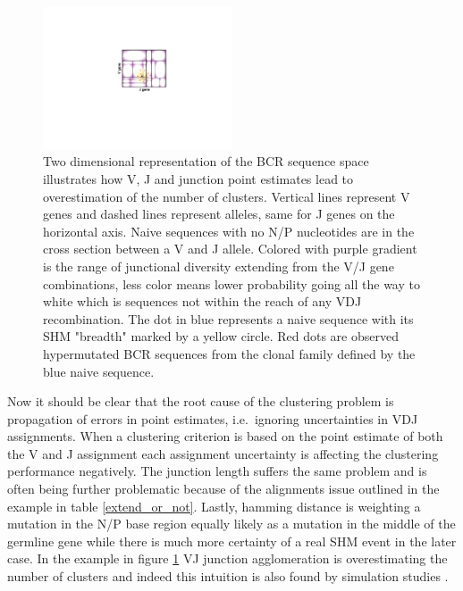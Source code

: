 \begin{figure}[ht]
    \centering
    \includegraphics[width=0.5\textwidth]{figures/VJ_CDR3_agglomeration.pdf}
    \caption{
        \label{fig:VJ_CDR3_agglomeration}
        Two dimensional representation of the BCR sequence space illustrates how V, J and junction point estimates lead to overestimation of the number of clusters.
        Vertical lines represent V genes and dashed lines represent alleles, same for J genes on the horizontal axis.
        Naive sequences with no N/P nucleotides are in the cross section between a V and J allele.
        Colored with purple gradient is the range of junctional diversity extending from the V/J gene combinations, less color means lower probability going all the way to white which is sequences not within the reach of any VDJ recombination.
        The dot in blue represents a naive sequence with its SHM "breadth" marked by a yellow circle.
        Red dots are observed hypermutated BCR sequences from the clonal family defined by the blue naive sequence.
    }
\end{figure}


Now it should be clear that the root cause of the clustering problem is propagation of errors in point estimates, i.e.\ ignoring uncertainties in VDJ assignments.
When a clustering criterion is based on the point estimate of both the V and J assignment each assignment uncertainty is affecting the clustering performance negatively.
The junction length suffers the same problem and is often being further problematic because of the alignments issue outlined in the example in table \ref{extend_or_not}.
Lastly, hamming distance is weighting a mutation in the N/P base region equally likely as a mutation in the middle of the germline gene while there is much more certainty of a real SHM event in the later case.
In the example in figure \ref{fig:VJ_CDR3_agglomeration} VJ junction agglomeration is overestimating the number of clusters and indeed this intuition is also found by simulation studies \cite{ralph2016likelihood}.

